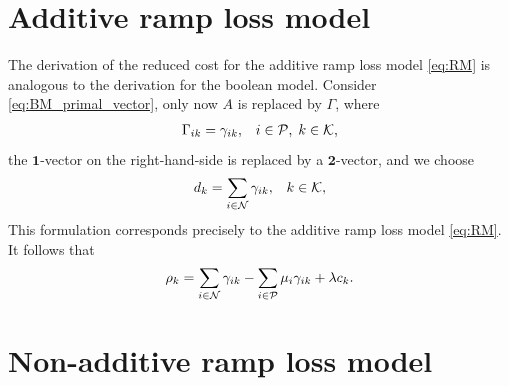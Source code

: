 \section{Additive ramp loss model}\label{sec:reduced_costs_additive_ramp_loss}
The derivation of the reduced cost for the additive ramp loss model \eqref{eq:RM} is analogous to the derivation for the boolean model.
Consider \eqref{eq:BM_primal_vector}, only now $A$ is replaced by $\Gamma$, where
\begin{align*}
    \Gamma_{ik} &= \gamma_{ik}, & i \in \mathcal{P}, \; k \in \mathcal{K},
\end{align*}
the $\bm{1}$-vector on the right-hand-side is replaced by a $\bm{2}$-vector,
and we choose
\begin{align*}
    d_k &= \sum_{i \in \mathcal{N}} \gamma_{ik}, & k \in \mathcal{K},
\end{align*}
This formulation corresponds precisely to the additive ramp loss model \eqref{eq:RM}.
It follows that
\begin{equation}\label{eq:RP_redcost_vector_derivation}
    \rho_k = \sum_{i \in \mathcal{N}} \gamma_{ik} - \sum_{i \in \mathcal{P}} \mu_i\gamma_{ik} + \lambda c_k.
\end{equation}

\section{Non-additive ramp loss model}\label{sec:reduced_costs_nonadditive_ramp_loss}


